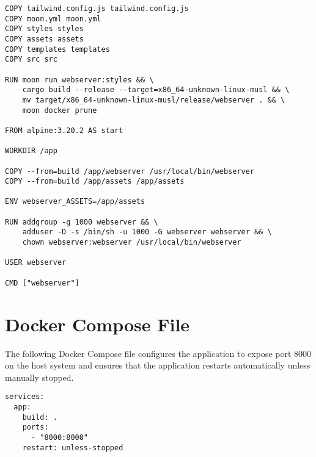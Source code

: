 \begin{lstlisting}[caption={Dockerfile for the Rust Web Server}, label=lst:dockerfile]
COPY tailwind.config.js tailwind.config.js
COPY moon.yml moon.yml
COPY styles styles
COPY assets assets
COPY templates templates
COPY src src

RUN moon run webserver:styles && \
    cargo build --release --target=x86_64-unknown-linux-musl && \
    mv target/x86_64-unknown-linux-musl/release/webserver . && \
    moon docker prune

FROM alpine:3.20.2 AS start

WORKDIR /app

COPY --from=build /app/webserver /usr/local/bin/webserver
COPY --from=build /app/assets /app/assets

ENV webserver_ASSETS=/app/assets

RUN addgroup -g 1000 webserver && \
    adduser -D -s /bin/sh -u 1000 -G webserver webserver && \
    chown webserver:webserver /usr/local/bin/webserver

USER webserver

CMD ["webserver"]
\end{lstlisting}

\section{Docker Compose File}

The following Docker Compose file configures the application to expose port 8000 on the host system
and ensures that the application restarts automatically unless manually stopped.

\label{appendix:docker:compose}
\begin{lstlisting}[caption={Docker Compose File for the Application}, label=lst:dockercompose]
services:
  app:
    build: .
    ports:
      - "8000:8000"
    restart: unless-stopped
\end{lstlisting}

